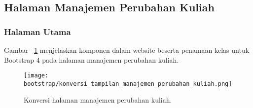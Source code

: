 \subsection{Halaman Manajemen Perubahan Kuliah}
\subsubsection{Halaman Utama}
\noindent Gambar ~\ref{fig:konversiManajemenPerubahanKuliah} menjelaskan komponen dalam website beserta penamaan kelas untuk Bootstrap 4 pada halaman manajemen perubahan kuliah.\\
\begin{figure} [H]
	\centering  
	\texttt{[image: bootstrap/konversi\_tampilan\_manajemen\_perubahan\_kuliah.png]}
	\caption{Konversi halaman manajemen perubahan kuliah.}
	\label{fig:konversiManajemenPerubahanKuliah}
\end{figure}

